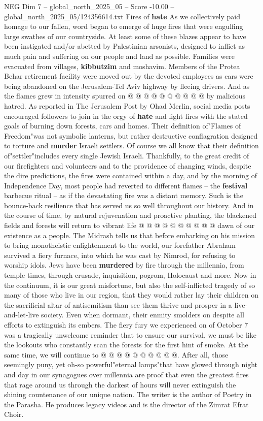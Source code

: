 \begin{textsample}{NEG Dim 7 – global\_north\_2025\_05 – Score -10.00 – global\_north\_2025\_05/124356614.txt}
Fires of \textbf{hate} As we collectively paid homage to our fallen, word began to emerge of huge fires that were engulfing large swathes of our countryside.
At least some of these blazes appear to have been instigated and/or abetted by Palestinian arsonists, designed to inflict as much pain and suffering on our people and land as possible.
Families were evacuated from villages, \textbf{kibbutzim} and moshavim.
Members of the Protea Behar retirement facility were moved out by the devoted employees as cars were being abandoned on the Jerusalem-Tel Aviv highway by fleeing drivers.
And as the flames grew in intensity spurred on @ @ @ @ @ @ @ @ @ @ by malicious hatred.
As reported in The Jerusalem Post by Ohad Merlin, social media posts encouraged followers to join in the orgy of \textbf{hate} and light fires with the stated goals of burning down forests, cars and homes.
Their definition of"Flames of Freedom"was not symbolic lanterns, but rather destructive conflagration designed to torture and \textbf{murder} Israeli settlers.
Of course we all know that their definition of"settler"includes every single Jewish Israeli.
Thankfully, to the great credit of our firefighters and volunteers and to the providence of changing winds, despite the dire predictions, the fires were contained within a day, and by the morning of Independence Day, most people had reverted to different flames -- the \textbf{festival} barbecue ritual -- as if the devastating fire was a distant memory.
Such is the bounce-back resilience that has served us so well throughout our history.
And in the course of time, by natural rejuvenation and proactive planting, the blackened fields and forests will return to vibrant life @ @ @ @ @ @ @ @ @ @ dawn of our existence as a people.
The Midrash tells us that before embarking on his mission to bring monotheistic enlightenment to the world, our forefather Abraham survived a fiery furnace, into which he was cast by Nimrod, for refusing to worship idols.
Jews have been \textbf{murdered} by fire through the millennia, from temple times, through crusade, inquisition, pogrom, Holocaust and more.
Now in the continuum, it is our great misfortune, but also the self-inflicted tragedy of so many of those who live in our region, that they would rather lay their children on the sacrificial altar of antisemitism than see them thrive and prosper in a live-and-let-live society.
Even when dormant, their enmity smolders on despite all efforts to extinguish its embers.
The fiery fury we experienced on of October 7 was a tragically unwelcome reminder that to ensure our survival, we must be like the lookouts who constantly scan the forests for the first hint of smoke.
At the same time, we will continue to @ @ @ @ @ @ @ @ @ @.
After all, those seemingly puny, yet oh-so powerful"eternal lamps"that have glowed through night and day in our synagogues over millennia are proof that even the greatest fires that rage around us through the darkest of hours will never extinguish the shining countenance of our unique nation.
The writer is the author of Poetry in the Parasha.
He produces legacy videos and is the director of the Zimrat Efrat Choir.


\end{textsample}
